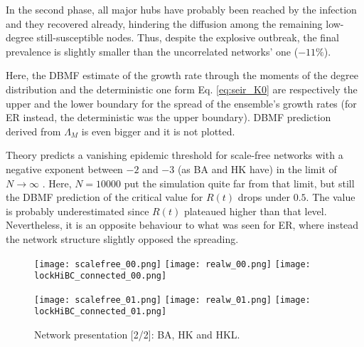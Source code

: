 \documentclass[DIV=12, BCOR=0pt]{scrartcl}  %
\begin{document}
  In the second phase, all major hubs have probably been reached by the infection and they recovered already, hindering the diffusion among the remaining low-degree still-susceptible nodes. Thus, despite the explosive outbreak, the final prevalence is slightly smaller than the uncorrelated networks' one ($- 11 \%$).
  
  Here, the DBMF estimate of the growth rate through the moments of the degree distribution and the deterministic one form Eq. \ref{eq:seir_K0} are respectively the upper and the lower boundary for the spread of the ensemble's growth rates (for ER instead, the deterministic was the upper boundary). DBMF prediction derived from $\Lambda_M$ is even bigger and it is not plotted. 
  
  Theory predicts a vanishing epidemic threshold for scale-free networks with a negative exponent between $-2$ and $-3$ (as BA and HK have) in the limit of $N \rightarrow \infty$ \citep{PastorSatorras}. Here, $N=10000$ put the simulation quite far from that limit, but still the DBMF prediction of the critical value for $R(t)$ drops under $0.5$. The value is probably underestimated since $R(t)$ plateaued higher than that level. Nevertheless, it is an opposite behaviour to what was seen for ER, where instead the network structure slightly opposed the spreading.
  
  
  \clearpage
  
  \begin{figure}[h!]
  	\centering
  	\texttt{[image: scalefree\_00.png]}
  	\texttt{[image: realw\_00.png]}
  	\texttt{[image: lockHiBC\_connected\_00.png]}
  	
  	\texttt{[image: scalefree\_01.png]}
  	\texttt{[image: realw\_01.png]}
  	\texttt{[image: lockHiBC\_connected\_01.png]}
  	\caption{Network presentation [2/2]: BA, HK and HKL.}
  	\label{fig:networks1}
  \end{figure}  	
  
\end{document}
